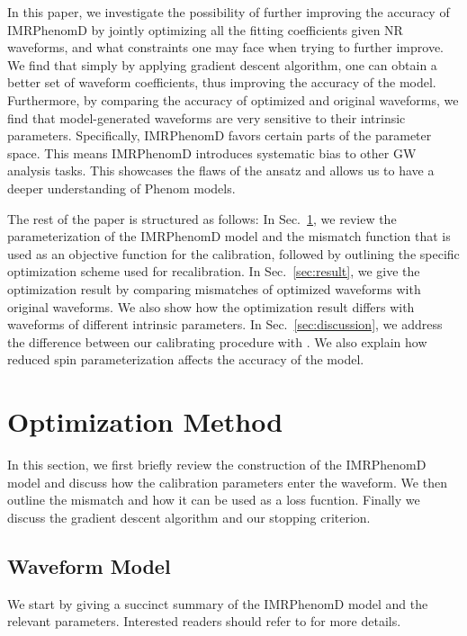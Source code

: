 \documentclass[twocolumn]{aastex631}
\begin{document}
In this paper, we investigate the possibility of further improving the accuracy
of IMRPhenomD by jointly optimizing all the fitting coefficients given NR
waveforms, and what constraints one may face when trying to further improve. We
find that simply by applying gradient descent algorithm, one can obtain a better
set of waveform coefficients, thus improving the accuracy of the model.
Furthermore, by comparing the accuracy of optimized and original waveforms, we
find that model-generated waveforms are very sensitive to their intrinsic
parameters. Specifically, IMRPhenomD favors certain parts of the parameter
space. This means IMRPhenomD introduces systematic bias to other GW analysis
tasks. This showcases the flaws of the ansatz and allows us to have a deeper
understanding of Phenom models.  

The rest of the paper is structured as follows: In Sec.~\ref{sec:method}, we
review the parameterization of the IMRPhenomD model and the mismatch function
that is used as an objective function for the calibration, followed by outlining the
specific optimization scheme used for recalibration. In
Sec.~\ref{sec:result}, we give the optimization result by comparing mismatches
of optimized waveforms with original waveforms. We also show how the
optimization result differs with waveforms of different intrinsic parameters. In
Sec.~\ref{sec:discussion}, we address the difference between our calibrating
procedure with \citep{khan2016frequency}. We also explain how reduced spin
parameterization affects the accuracy of the model. 

\section{Optimization Method} \label{sec:method}

In this section, we first briefly review the construction of the IMRPhenomD model and discuss
how the calibration parameters enter the waveform.
We then outline the mismatch and how it can be used as a loss fucntion. 
Finally we discuss the gradient descent algorithm and our stopping criterion.

\subsection{Waveform Model} \label{subsec:waveform_model}

We start by giving a succinct summary of the IMRPhenomD model and the relevant parameters.
Interested readers should refer to \citep{khan2016frequency} for more details.
\end{document}
